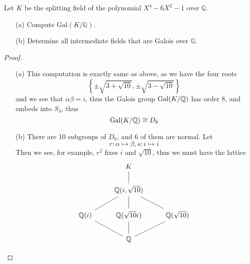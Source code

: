 \begin{prob}[S2008-Q3]
    Let \(K\) be the splitting field of the polynomial \(X^4 - 6X^2 - 1\) over \(\mathbb{Q}\).
    \begin{itemize}
        \item[(a)] Compute \(\text{Gal}(K/\mathbb{Q})\).
        \item[(b)] Determine all intermediate fields that are Galois over \(\mathbb{Q}\).
    \end{itemize}
\end{prob}
\begin{proof}
    \begin{itemize}
        \item[(a)] This computation is exactly same as above, as we have the four roots 
        \begin{equation*}
            \left\{\pm\sqrt{3+\sqrt{10}}, \pm\sqrt{3-\sqrt{10}}\right\}
        \end{equation*}
        and we see that $\alpha\beta=i$, thus the Galois group $\text{Gal}(K/\mathbb{Q})$ has order $8$, and embeds into $S_4$, thus 
        \begin{equation*}
            \text{Gal}(K/\mathbb{Q})\cong D_8
        \end{equation*}
        \item[(b)] There are 10 subgroups of $D_8$, and $6$ of them are normal. Let 
        \begin{equation*}
            r: \alpha\mapsto\beta, s: i\mapsto i
        \end{equation*}
        Then we see, for example, $r^2$ fixes $i$ and $\sqrt{10}$, thus we must have the lattice 
        \[\begin{tikzcd}
            & K \\
            & {\mathbb{Q}(i, \sqrt{10})} \\
            {\mathbb{Q}(i)} & {\mathbb{Q}(\sqrt{10}i)} & {\mathbb{Q}(\sqrt{10})} \\
            & {\mathbb{Q}}
            \arrow[no head, from=2-2, to=1-2]
            \arrow[no head, from=3-1, to=2-2]
            \arrow[no head, from=3-2, to=2-2]
            \arrow[no head, from=3-2, to=4-2]
            \arrow[no head, from=3-3, to=2-2]
            \arrow[no head, from=4-2, to=3-1]
            \arrow[no head, from=4-2, to=3-3]
        \end{tikzcd}\]
    \end{itemize}
\end{proof}






